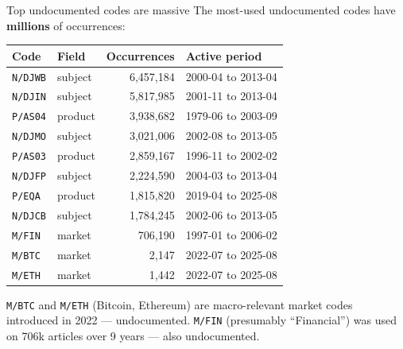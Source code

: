 \documentclass[10pt,aspectratio=169]{beamer}
\begin{document}
\begin{frame}{Top undocumented codes are massive}
  \footnotesize
  The most-used undocumented codes have \textbf{millions} of occurrences:

  \medskip
  \begin{tabular}{@{}llrp{4.8cm}@{}}
    \toprule
    \textbf{Code} & \textbf{Field} & \textbf{Occurrences} & \textbf{Active period} \\
    \midrule
    \texttt{N/DJWB} & subject &  6,457,184 & 2000-04 to 2013-04 \\
    \texttt{N/DJIN} & subject &  5,817,985 & 2001-11 to 2013-04 \\
    \texttt{P/AS04}  & product &  3,938,682 & 1979-06 to 2003-09 \\
    \texttt{N/DJMO} & subject &  3,021,006 & 2002-08 to 2013-05 \\
    \texttt{P/AS03}  & product &  2,859,167 & 1996-11 to 2002-02 \\
    \texttt{N/DJFP}  & subject &  2,224,590 & 2004-03 to 2013-04 \\
    \texttt{P/EQA}   & product &  1,815,820 & 2019-04 to 2025-08 \\
    \texttt{N/DJCB}  & subject &  1,784,245 & 2002-06 to 2013-05 \\
    \texttt{M/FIN}   & market  &    706,190 & 1997-01 to 2006-02 \\
    \texttt{M/BTC}   & market  &      2,147 & 2022-07 to 2025-08 \\
    \texttt{M/ETH}   & market  &      1,442 & 2022-07 to 2025-08 \\
    \bottomrule
  \end{tabular}

  \medskip
  \small
  \texttt{M/BTC} and \texttt{M/ETH} (Bitcoin, Ethereum) are macro-relevant
  market codes introduced in 2022 --- undocumented. \texttt{M/FIN}
  (presumably ``Financial'') was used on 706k articles over 9 years ---
  also undocumented.
\end{frame}
\end{document}
